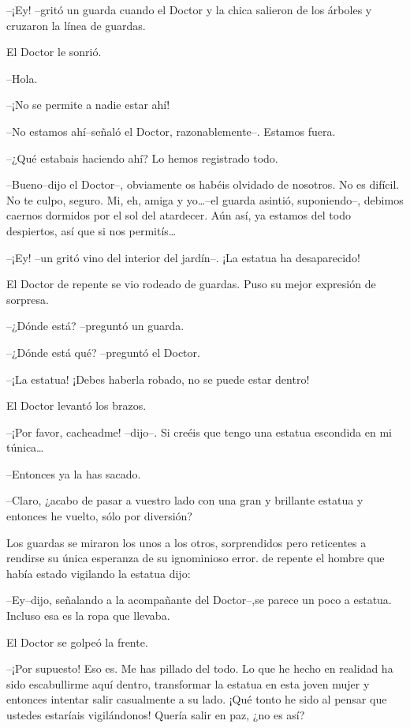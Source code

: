 --¡Ey! --gritó un guarda cuando el Doctor y la chica salieron de los
árboles y cruzaron la línea de guardas.

El Doctor le sonrió.

--Hola.

--¡No se permite a nadie estar ahí!

--No estamos ahí--señaló el Doctor, razonablemente--. Estamos fuera.

--¿Qué estabais haciendo ahí? Lo hemos registrado todo.

--Bueno--dijo el Doctor--, obviamente os habéis olvidado de nosotros. No
es difícil. No te culpo, seguro. Mi, eh, amiga y yo\ldots{}--el guarda
asintió, suponiendo--, debimos caernos dormidos por el sol del
atardecer. Aún así, ya estamos del todo despiertos, así que si nos
permitís\ldots{}

--¡Ey! --un gritó vino del interior del jardín--. ¡La estatua ha
desaparecido!

El Doctor de repente se vio rodeado de guardas. Puso su mejor expresión
de sorpresa.

--¿Dónde está? --preguntó un guarda.

--¿Dónde está qué? --preguntó el Doctor.

--¡La estatua! ¡Debes haberla robado, no se puede estar dentro!

El Doctor levantó los brazos.

--¡Por favor, cacheadme! --dijo--. Si creéis que tengo una estatua
escondida en mi túnica\ldots{}

--Entonces ya la has sacado.

--Claro, ¿acabo de pasar a vuestro lado con una gran y brillante estatua
y entonces he vuelto, sólo por diversión?

Los guardas se miraron los unos a los otros, sorprendidos pero
reticentes a rendirse su única esperanza de su ignominioso error. de
repente el hombre que había estado vigilando la estatua dijo:

--Ey--dijo, señalando a la acompañante del Doctor--,se parece un poco a
estatua. Incluso esa es la ropa que llevaba.

El Doctor se golpeó la frente.

--¡Por supuesto! Eso es. Me has pillado del todo. Lo que he hecho en
realidad ha sido escabullirme aquí dentro, transformar la estatua en
esta joven mujer y entonces intentar salir casualmente a su lado. ¡Qué
tonto he sido al pensar que ustedes estaríais vigilándonos! Quería salir
en paz, ¿no es así?

